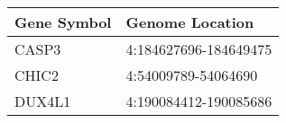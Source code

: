 \begin{tabular}{ll}
\toprule
Gene Symbol &       Genome Location \\
\midrule
      CASP3 & 4:184627696-184649475 \\
      CHIC2 &   4:54009789-54064690 \\
     DUX4L1 & 4:190084412-190085686 \\
\bottomrule
\end{tabular}
